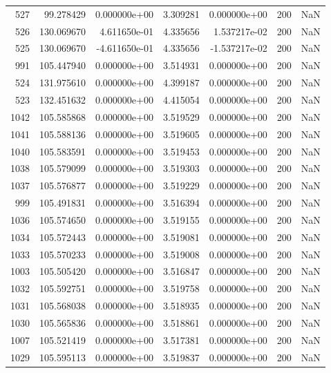 \begin{tabular}{rrrrrrr}
 527 &  99.278429 &  0.000000e+00 &  3.309281 &  0.000000e+00 &         200 & NaN \\
 526 & 130.069670 &  4.611650e-01 &  4.335656 &  1.537217e-02 &         200 & NaN \\
 525 & 130.069670 & -4.611650e-01 &  4.335656 & -1.537217e-02 &         200 & NaN \\
 991 & 105.447940 &  0.000000e+00 &  3.514931 &  0.000000e+00 &         200 & NaN \\
 524 & 131.975610 &  0.000000e+00 &  4.399187 &  0.000000e+00 &         200 & NaN \\
 523 & 132.451632 &  0.000000e+00 &  4.415054 &  0.000000e+00 &         200 & NaN \\
1042 & 105.585868 &  0.000000e+00 &  3.519529 &  0.000000e+00 &         200 & NaN \\
1041 & 105.588136 &  0.000000e+00 &  3.519605 &  0.000000e+00 &         200 & NaN \\
1040 & 105.583591 &  0.000000e+00 &  3.519453 &  0.000000e+00 &         200 & NaN \\
1038 & 105.579099 &  0.000000e+00 &  3.519303 &  0.000000e+00 &         200 & NaN \\
1037 & 105.576877 &  0.000000e+00 &  3.519229 &  0.000000e+00 &         200 & NaN \\
 999 & 105.491831 &  0.000000e+00 &  3.516394 &  0.000000e+00 &         200 & NaN \\
1036 & 105.574650 &  0.000000e+00 &  3.519155 &  0.000000e+00 &         200 & NaN \\
1034 & 105.572443 &  0.000000e+00 &  3.519081 &  0.000000e+00 &         200 & NaN \\
1033 & 105.570233 &  0.000000e+00 &  3.519008 &  0.000000e+00 &         200 & NaN \\
1003 & 105.505420 &  0.000000e+00 &  3.516847 &  0.000000e+00 &         200 & NaN \\
1032 & 105.592751 &  0.000000e+00 &  3.519758 &  0.000000e+00 &         200 & NaN \\
1031 & 105.568038 &  0.000000e+00 &  3.518935 &  0.000000e+00 &         200 & NaN \\
1030 & 105.565836 &  0.000000e+00 &  3.518861 &  0.000000e+00 &         200 & NaN \\
1007 & 105.521419 &  0.000000e+00 &  3.517381 &  0.000000e+00 &         200 & NaN \\
1029 & 105.595113 &  0.000000e+00 &  3.519837 &  0.000000e+00 &         200 & NaN \\

\end{tabular}
